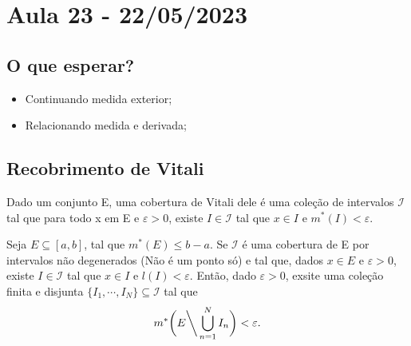 \documentclass[Analysis/analysis_notes.tex]{subfiles}
\begin{document}
\section{Aula 23 - 22/05/2023}
\subsection{O que esperar?}
\begin{itemize}
	\item Continuando medida exterior;
	\item Relacionando medida e derivada;
\end{itemize}
\subsection{Recobrimento de Vitali}
Dado um conjunto E, uma cobertura de Vitali dele é uma cole\c cão de intervalos
\(\mathcal{I}\) tal que para todo x em E e \(\varepsilon  > 0\), existe \(I\in \mathcal{I}\) tal que
\(x\in I\) e \(m^{*}(I) < \varepsilon .\)
\begin{lemma*}
	Seja \(E\subseteq{[a, b]}\), tal que \(m^{*}(E)\leq b-a.\) Se \(\mathcal{I}\)
	é uma cobertura de E por intervalos não degenerados (Não é um ponto só) e tal que, dados \(x\in E\) e
	\(\varepsilon >0\), existe \(I\in \mathcal{I}\) tal que \(x\in I\) e \(l(I) < \varepsilon .\)
	Então, dado \(\varepsilon  > 0\), exsite uma cole\c cão finita e disjunta \(\{I_{1}, \cdots, I_{N}\}\subseteq{\mathcal{I}}\)
	tal que
	\[
		m^{*}\biggl(E\biggl\backslash\biggr. \bigcup_{n=1}^{N}{I_{n}}\biggr) < \varepsilon .
	\]
\end{lemma*}
\end{document}
